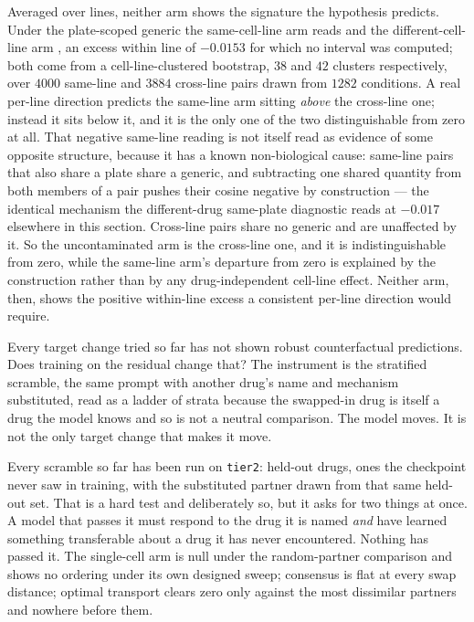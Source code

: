 Averaged over lines, neither arm shows the signature the hypothesis predicts.
Under the plate-scoped generic the same-cell-line arm reads
 and the different-cell-line arm
, an excess within line of $-0.0153$ for which no
interval was computed; both come from a cell-line-clustered bootstrap,
$\num{38}$ and $\num{42}$ clusters respectively, over $\num{4000}$ same-line and
$\num{3884}$ cross-line pairs drawn from $\num{1282}$ conditions. A real
per-line direction predicts the same-line arm sitting \emph{above} the
cross-line one; instead it sits below it, and it is the only one of the two
distinguishable from zero at all. That negative same-line reading is not itself
read as evidence of some opposite structure, because it has a known
non-biological cause: same-line pairs that also share a plate share a generic,
and subtracting one shared quantity from both members of a pair pushes their
cosine negative by construction --- the identical mechanism the different-drug
same-plate diagnostic reads at $-0.017$ elsewhere in this section. Cross-line
pairs share no generic and are unaffected by it. So the uncontaminated arm is
the cross-line one, and it is indistinguishable from zero, while the same-line
arm's departure from zero is explained by the construction rather than by any
drug-independent cell-line effect. Neither arm, then, shows the positive
within-line excess a consistent per-line direction would require. 



\begin{question}[5]
Every target change tried so far has not shown robust counterfactual predictions. Does training on the residual change that? The instrument is the
stratified scramble, the same prompt with another drug's name and mechanism
substituted, read as a ladder of strata because the swapped-in drug is itself a
drug the model knows and so is not a neutral comparison. The model moves. It is
not the only target change that makes it move.
\end{question}

\noindent

Every scramble so far has been run on \texttt{tier2}: held-out drugs, ones the
checkpoint never saw in training, with the substituted partner drawn from that
same held-out set. That is a hard test and deliberately so, but it asks for two
things at once. A model that passes it must respond to the drug it is named
\emph{and} have learned something transferable about a drug it has never
encountered. Nothing has passed it. The single-cell arm is null under the
random-partner comparison and shows no ordering under its own designed sweep;
consensus is flat at every swap distance; optimal transport clears zero only
against the most dissimilar partners and nowhere before them.

